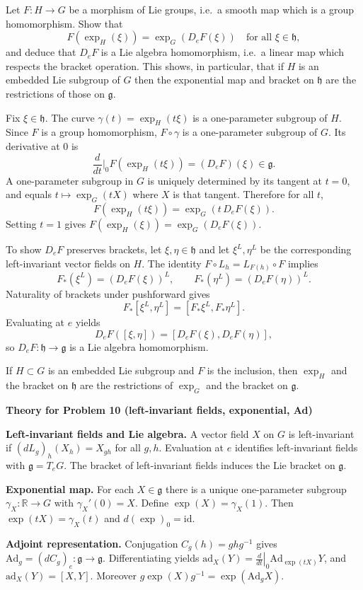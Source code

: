 \begin{problem}
\label{prob:cp-vii-0014}
Let $F:H\to G$ be a morphism of Lie groups, i.e.\ a smooth map which is a group homomorphism.
Show that
\[
F(\exp_H(\xi))=\exp_G(D_eF(\xi))\quad\text{for all }\xi\in\mathfrak h,
\]
and deduce that $D_eF$ is a Lie algebra homomorphism, i.e.\ a linear map which respects the bracket operation.
This shows, in particular, that if $H$ is an embedded Lie subgroup of $G$ then the exponential map and bracket
on $\mathfrak h$ are the restrictions of those on $\mathfrak g$.
\end{problem}

\begin{solution}
Fix $\xi\in\mathfrak h$. The curve $\gamma(t)=\exp_H(t\xi)$ is a one-parameter subgroup of $H$.
Since $F$ is a group homomorphism, $F\circ\gamma$ is a one-parameter subgroup of $G$.
Its derivative at $0$ is
\[
\frac{d}{dt}\Big|_{0}F(\exp_H(t\xi))=(D_eF)(\xi)\in\mathfrak g.
\]
A one-parameter subgroup in $G$ is uniquely determined by its tangent at $t=0$, and equals
$t\mapsto \exp_G(tX)$ where $X$ is that tangent. Therefore for all $t$,
\[
F(\exp_H(t\xi))=\exp_G(t\,D_eF(\xi)).
\]
Setting $t=1$ gives $F(\exp_H(\xi))=\exp_G(D_eF(\xi))$.

To show $D_eF$ preserves brackets, let $\xi,\eta\in\mathfrak h$ and let $\xi^L,\eta^L$ be the corresponding
left-invariant vector fields on $H$. The identity $F\circ L_h=L_{F(h)}\circ F$ implies
\[
F_*(\xi^L)=(D_eF(\xi))^L,\qquad F_*(\eta^L)=(D_eF(\eta))^L.
\]
Naturality of brackets under pushforward gives
\[
F_*[\xi^L,\eta^L]=[F_*\xi^L,F_*\eta^L].
\]
Evaluating at $e$ yields
\[
D_eF([\xi,\eta])=[D_eF(\xi),D_eF(\eta)],
\]
so $D_eF:\mathfrak h\to\mathfrak g$ is a Lie algebra homomorphism.

If $H\subset G$ is an embedded Lie subgroup and $F$ is the inclusion, then $\exp_H$ and the bracket on
$\mathfrak h$ are the restrictions of $\exp_G$ and the bracket on $\mathfrak g$.

\par\medskip\noindent\textbf{Theory for Problem 10 (left-invariant fields, exponential, Ad)}\par\smallskip


\textbf{Left-invariant fields and Lie algebra.}
A vector field $X$ on $G$ is left-invariant if $(dL_g)_h(X_h)=X_{gh}$ for all $g,h$.
Evaluation at $e$ identifies left-invariant fields with $\mathfrak g=T_eG$.
The bracket of left-invariant fields induces the Lie bracket on $\mathfrak g$.

\textbf{Exponential map.}
For each $X\in\mathfrak g$ there is a unique one-parameter subgroup $\gamma_X:\mathbb R\to G$
with $\gamma_X'(0)=X$. Define $\exp(X)=\gamma_X(1)$.
Then $\exp(tX)=\gamma_X(t)$ and $d(\exp)_0=\mathrm{id}$.

\textbf{Adjoint representation.}
Conjugation $C_g(h)=ghg^{-1}$ gives $\mathrm{Ad}_g=(dC_g)_e:\mathfrak g\to\mathfrak g$.
Differentiating yields $\mathrm{ad}_X(Y)=\left.\frac{d}{dt}\right|_0\mathrm{Ad}_{\exp(tX)}Y$,
and $\mathrm{ad}_X(Y)=[X,Y]$.
Moreover $g\exp(X)g^{-1}=\exp(\mathrm{Ad}_g X)$.
\end{solution}


